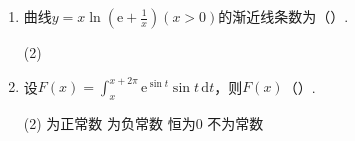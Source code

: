 \documentclass[../Main.tex]{subfiles}
\begin{document}
\begin{enumerate}
          \begin{tasks}[label=\textbf{\Alph*.}, label-width=1.5em, column-sep=1em](1)
              \task 若$\lim_{x\to0}\frac{f(x)}{x}$存在，则$f(0)=0$
              \task 若$\lim_{x\to0}\frac{f(x)+f(-x)}{x}$存在，则$f(0)=0$
              \task 若$\lim_{x\to0}\frac{f(x)}{x}$存在，则$f'(0)$存在
              \task 若$\lim_{x\to0}\frac{f(x)-f(-x)}{x}$存在，则$f'(0)$存在
          \end{tasks}
          \vspace{1em}

    \item 曲线$y=x\ln\left(\mathrm{e}+\frac{1}{x}\right)(x>0)$的渐近线条数为（\qquad）.

          \begin{tasks}[label=\textbf{\Alph*.}, label-width=1.5em, column-sep=1em](2)
          \end{tasks}
          \vspace{1em}

    \item 设$F(x)=\int^{x+2\pi}_{x}\mathrm{e}^{\sin t}\sin t\,\mathrm{d}t$，则$F(x)$（\qquad）.

          \begin{tasks}[label=\textbf{\Alph*.}, label-width=1.5em, column-sep=1em](2)
              \task 为正常数
              \task 为负常数
              \task 恒为0
              \task 不为常数
          \end{tasks}
          \vspace{1em}
\end{enumerate}
\end{document}
